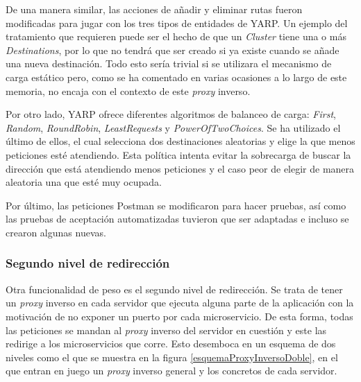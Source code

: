 \documentclass[11pt,spanish,listoffigures]{tfgetsinf}
\begin{document}
De una manera similar, las acciones de añadir y eliminar rutas fueron modificadas para jugar con los tres tipos de entidades de YARP. Un ejemplo del tratamiento que requieren puede ser el hecho de que un \emph{Cluster} tiene una o más \emph{Destinations}, por lo que no tendrá que ser creado si ya existe cuando se añade una nueva destinación. Todo esto sería trivial si se utilizara el mecanismo de carga estático pero, como se ha comentado en varias ocasiones a lo largo de este memoria, no encaja con el contexto de este \emph{proxy} inverso.

Por otro lado, YARP ofrece diferentes algoritmos de balanceo de carga: \emph{First}, \emph{Random}, \emph{RoundRobin}, \emph{LeastRequests} y \emph{PowerOfTwoChoices}. Se ha utilizado el último de ellos, el cual selecciona dos destinaciones aleatorias y elige la que menos peticiones esté atendiendo. Esta política intenta evitar la sobrecarga de buscar la dirección que está atendiendo menos peticiones y el caso peor de elegir de manera aleatoria una que esté muy ocupada.

Por último, las peticiones Postman se modificaron para hacer pruebas, así como las pruebas de aceptación automatizadas tuvieron que ser adaptadas e incluso se crearon algunas nuevas.


			\subsubsection{Segundo nivel de redirección}

Otra funcionalidad de peso es el segundo nivel de redirección. Se trata de tener un \emph{proxy} inverso en cada servidor que ejecuta alguna parte de la aplicación con la motivación de no exponer un puerto por cada microservicio. De esta forma, todas las peticiones se mandan al \emph{proxy} inverso del servidor en cuestión y este las redirige a los microservicios que corre. Esto desemboca en un esquema de dos niveles como el que se muestra en la figura \ref{esquemaProxyInversoDoble}, en el que entran en juego un \emph{proxy} inverso general y los concretos de cada servidor.
\end{document}
